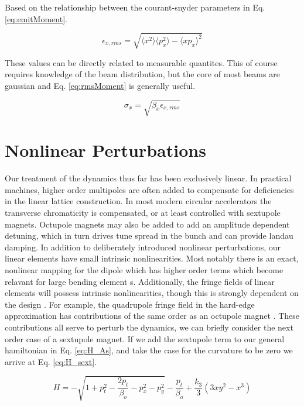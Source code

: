 Based on the relationship between the courant-snyder parameters in Eq. \ref{eq:emitMoment}.

\begin{equation} \label{eq:emitMoment}
	\epsilon_{x,rms} = \sqrt{\langle x^2 \rangle \langle p_x^2 \rangle - \langle x p_x \rangle^2}
\end{equation}

These values can be directly related to measurable quantites. This of course requires knowledge of the beam distribution, but the core of most beams are gaussian and Eq. \ref{eq:rmsMoment} is generally useful.

\begin{equation} \label{eq:rmsMoment}
	\sigma_x = \sqrt{\beta_x \epsilon_{x,rms}}
\end{equation}

\section{Nonlinear Perturbations} \label{sec:nonlinearPerturb}
Our treatment of the dynamics thus far has been exclusively linear. In practical machines, higher order multipoles are often added to compensate for deficiencies in the linear lattice construction. In most modern circular accelerators the transverse chromaticity is compensated, or at least controlled with sextupole magnets. Octupole magnets may also be added to add an amplitude dependent detuning, which in turn drives tune spread in the bunch and can provide landau damping. In addition to deliberately introduced nonlinear perturbations, our linear elements have small intrinsic nonlinearities. Most notably there is an exact, nonlinear mapping for the dipole which has higher order terms which become relavant for large bending element \cite{Exact Sbend}s. Additionally, the fringe fields of linear elements will possess intrinsic nonlinearities, though this is strongly dependent on the design \cite{Baartman}. For example, the quadrupole fringe field in the hard-edge approximation has contributions of the same order as an octupole magnet \cite{Forrest}. These contributions all serve to perturb the dynamics, we can briefly consider the next order case of a sextupole magnet. If we add the sextupole term to our general hamiltonian in Eq. \ref{eq:H_As}, and take the case for the curvature to be zero we arrive at Eq. \ref{eq:H_sext}.

\begin{equation} \label{eq:H_sext}
	H = -\sqrt{1 + p_t^2 - \frac{2p_t}{\beta_o} - p_x^2 - p_y^2} - \frac{p_t}{\beta_o} + \frac{k_3}{3}(3 x y^2 - x^3)
\end{equation}

